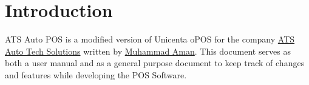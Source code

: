 \section{Introduction}

ATS Auto POS is a modified version of Unicenta oPOS for the company \href{www.atsauto.com.my}{ATS Auto Tech Solutions} written by \href{https://github.com/LaudemPax}{Muhammad Aman}. This document serves as both a user manual and as a general purpose document to keep track of changes and features while developing the POS Software.